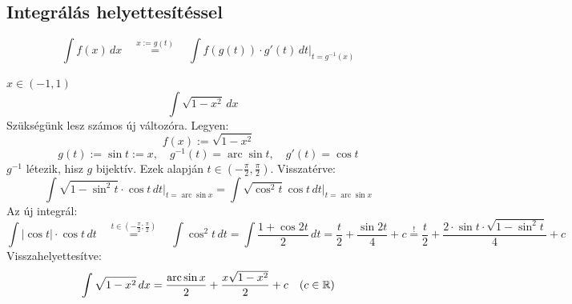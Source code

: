 \documentclass[a4paper,11.5pt]{article}
\DeclareMathOperator{\arc}{arc}
\begin{document}
	\subsection{Integrálás helyettesítéssel}
	\begin{revision}
		\[ \int f(x)\,dx\quad \overset{x:=g(t)}{=}\quad \int f(g(t))\cdot g'(t)\,dt\big|_{t=g^{-1}(x)} \]
	\end{revision}
	\begin{task}$x\in(-1,1)$ \label{sqrt(1-x^2)}
		\[\int\sqrt{1-x^2}\,dx \quad\]
		Szükségünk lesz számos új változóra. Legyen:
		\[ f(x):=\sqrt{1-x^2} \]
		\[ g(t) := \sin t := x,\quad g^{-1}(t) = \arc\sin t,\quad g'(t) = \cos t \]
		$g^{-1}$ létezik, hisz $g$ bijektív. Ezek alapján $t\in\left(-\frac{\pi}{2},\frac{\pi}{2} \right)$. Visszatérve:
		\[\int\sqrt{1-\sin^2t}\cdot\cos t\,dt\big|_{t=\arc\sin x}=\int\sqrt{\cos^2t}\cos t\,dt\big|_{t=\arc\sin x} \]
		Az új integrál:
		\[ \int|\cos t|\cdot\cos t\,dt\quad \overset{t\in\left(-\frac{\pi}{2};\frac{\pi}{2}\right)}{=}\quad \int\cos^2t\,dt=\int\frac{1+\cos2t}{2}\,dt=\frac{t}{2}+\frac{\sin2t}{4}+c \overset{!}{=} \frac{t}{2}+\frac{2\cdot\sin t\cdot\sqrt{1-\sin^2t}}{4}+c \]
		Visszahelyettesítve:
		\[ \int\sqrt{1-x^2}\,dx=\frac{\arc\sin x}{2}+\frac{x\sqrt{1-x^2}}{2}+c\quad (c\in\R) \] 
	\end{task}
	
\end{document}
